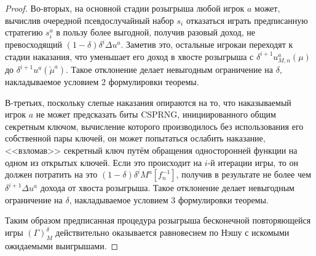 \begin{proof}
	Во-вторых, на основной стадии розыгрыша любой игрок $a$ может, вычислив очередной псевдослучайный набор $s_i$ отказаться играть предписанную стратегию $s_i^a$ в пользу более выгодной, получив разовый доход, не превосходящий $(1 - \delta) \delta^i \Delta u^a$. Заметив это, остальные игрокаи переходят к стадии наказания, что уменьшает его доход в хвосте розыгрыша с $\delta^{i+1} u_{M,n}^a(\mu)$ до $\delta^{i+1} u^a(\check{\mu}^a)$. Такое отклонение делает невыгодным ограничение на $\delta$, накладываемое условием 2 формулировки теоремы.
	
	В-третьих, поскольку слепые наказания опираются на то, что наказываемый игрок $a$ не может предсказать биты CSPRNG, инициированного общим секретным ключом, вычисление которого производилось без использования его собственной пары ключей, он может попытаться ослабить наказание, <<взломав>> секретный ключ путём обращения односторонней функции на одном из открытых ключей. Если это происходит на $i$-й итерации игры, то он должен потратить на это $(1 - \delta) \delta^i M^a[f_n^{-1}]$, получив в результате не более чем $\delta^{i+1} \Delta u^a$ дохода от хвоста розыгрыша. Такое отклонение делает невыгодным ограничение на $\delta$, накладываемое условием 3 формулировки теоремы.
	
	Таким образом предписанная процедура розыгрыша бесконечной повторяющейся игры $(\Gamma)_M^{\delta}$ действительно оказывается равновесием по Нэшу с искомыми ожидаемыми выигрышами. %
\end{proof}

